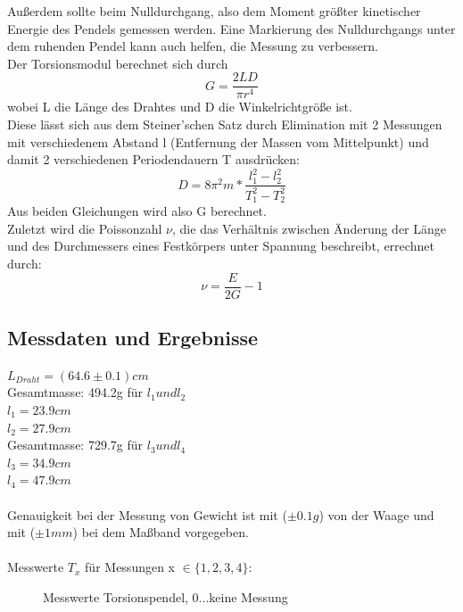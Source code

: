 \documentclass[12pt,a4paper]{article}
\begin{document}
\begin{multicols}{2}
Außerdem sollte beim Nulldurchgang, also dem Moment größter kinetischer Energie des Pendels gemessen werden. Eine Markierung des Nulldurchgangs unter dem ruhenden Pendel kann auch helfen, die Messung zu verbessern.\\
Der Torsionsmodul berechnet sich durch\\
$$G = \frac{2LD}{\pi r^4}$$
wobei L die Länge des Drahtes und D die Winkelrichtgröße ist.\\
Diese lässt sich aus dem Steiner'schen Satz durch Elimination mit 2 Messungen mit verschiedenem Abstand l (Entfernung der Massen vom Mittelpunkt) und damit 2 verschiedenen Periodendauern T ausdrücken:\\
$$ D=8\pi ^2 m* \frac{l_1^2-l_2^2}{T_1^2-T_2^2}$$
Aus beiden Gleichungen wird also G berechnet.\\
Zuletzt wird die Poissonzahl $\nu$, die das Verhältnis zwischen Änderung der Länge und des Durchmessers eines Festkörpers unter Spannung beschreibt, errechnet durch:\\
$$ \nu = \frac{E}{2G}-1$$



\subsection{Messdaten und Ergebnisse}
$L_{Draht} = (64.6 \pm 0.1)cm$\\
Gesamtmasse: 494.2g für $l_1 und l_2$\\
$l_1 = 23.9cm$\\
$l_2 = 27.9cm$\\
Gesamtmasse: 729.7g für $l_3 und l_4$\\
$l_3 = 34.9cm$\\
$l_4 = 47.9cm$\\
\\
Genauigkeit bei der Messung von Gewicht ist mit ($\pm 0.1g$) von der Waage und mit ($\pm 1mm$) bei dem Maßband vorgegeben.\\
\\
Messwerte $T_x$ für Messungen x $\in\{1,2,3,4\}$:\\

\begin{figure}[H]
	\centering
	\caption{Messwerte Torsionspendel, 0...keine Messung}
	\label{fig:torsion_mw}
\end{figure}


\end{multicols}
\end{document}
